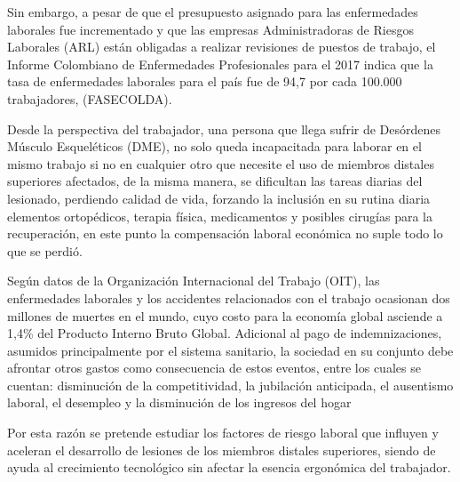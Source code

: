 Sin embargo, a pesar de que el presupuesto asignado para las enfermedades laborales fue incrementado y que las empresas Administradoras de Riesgos Laborales (ARL) están obligadas a realizar revisiones de puestos de trabajo, el Informe Colombiano de Enfermedades Profesionales para el 2017 indica que la tasa de enfermedades laborales para el país fue de 94,7 por cada 100.000 trabajadores, (FASECOLDA). 

Desde la perspectiva del trabajador, una persona que llega sufrir de Desórdenes Músculo Esqueléticos (DME), no solo queda incapacitada para laborar en el mismo trabajo si no en cualquier otro que necesite el uso de miembros distales superiores afectados, de la misma manera, se dificultan las tareas diarias del lesionado, perdiendo calidad de vida, forzando la inclusión en su rutina diaria elementos ortopédicos, terapia física, medicamentos y posibles cirugías para la recuperación, en este punto la compensación laboral económica no suple todo lo que se perdió. 

Según datos de la Organización Internacional del
Trabajo (OIT), las enfermedades laborales y los accidentes
relacionados con el trabajo ocasionan dos millones de
muertes en el mundo, cuyo costo para la economía global asciende
a 1,4\% del Producto Interno Bruto Global. Adicional al
pago de indemnizaciones, asumidos principalmente por el
sistema sanitario, la sociedad en su conjunto debe afrontar
otros gastos como consecuencia de estos eventos, entre
los cuales se cuentan: disminución de la competitividad, la
jubilación anticipada, el ausentismo laboral, el desempleo
y la disminución de los ingresos del hogar \parencite{OrganizacionInternacionaldelTrabajo2003OIT:Billones}


Por esta razón se pretende estudiar los factores de riesgo laboral que influyen y aceleran el desarrollo de lesiones de los miembros distales superiores, siendo de ayuda al crecimiento tecnológico sin afectar la esencia ergonómica del trabajador.



